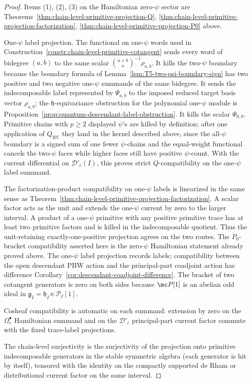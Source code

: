 \begin{proof}
  Items (1), (2), (3) on the Hamiltonian zero-$\psi$ sector are
  Theorems~\ref{thm:chain-level-primitive-projection-Q},
  \ref{thm:chain-level-primitive-projection-factorization},
  \ref{thm:chain-level-primitive-projection-P0} above.

  One-$\psi$ label projection.  The functional on one-\(\psi\) words used in
  Construction~\ref{constr:chain-level-primitive-cotangent} sends every
  word of bidegree \((a,b)\) to the same scalar
  \(\binom{a+b}{a}^{-1}\rho_{a,b}\).  It kills the two-\(\psi\) boundary
  because the boundary formula of
  Lemma~\ref{lem:T5-two-psi-boundary-sign} has two positive and two
  negative one-\(\psi\) summands of the same bidegree.  It sends
	  the indecomposable label represented by \(\Psi_{a,b}\) to the imposed
	  reduced target basis vector \(\rho_{a,b}\); the
	  \(\mathfrak h\)-equivariance obstruction for the polynomial
	  one-\(\psi\) module is
	  Proposition~\ref{prop:quantum-descendant-label-obstruction}.  It kills the scalar
  \(\Psi_{0,0}\).  Primitive chains with \(p\ge2\) displayed
  \(\psi\)'s are killed by definition; after one application of
  \(Q_{\mathrm{BV}}\) they land in the kernel described above, since the
  all-\(\psi\) boundary is a signed sum of one fewer \(\psi\)-chains and
  the equal-weight functional cancels the two-\(\psi\) faces while higher
  faces still have positive \(\psi\)-count.  With the current
  differential on \(\mathcal D'_c(I)\), this proves strict
  \(Q\)-compatibility on the one-\(\psi\) label summand.

  The factorization-product compatibility on one-\(\psi\) labels is
  linearized in the same sense as
  Theorem~\ref{thm:chain-level-primitive-projection-factorization}.  A
  scalar factor acts as the unit and extends the one-\(\psi\) current by
  zero to the larger interval.  A product of a one-\(\psi\) primitive with
  any positive primitive trace has at least two primitive factors and is
  killed in the indecomposable quotient.  Thus the unit-retaining
  exactly-one-positive projection agrees on the two routes.  The
		  $P_0$-bracket compatibility asserted here is the zero-$\psi$
		  Hamiltonian statement already proved above. The one-$\psi$ label projection
		  records labels; compatibility between the open descendant PBW
		  action and the principal-part coadjoint action has difference
		  Corollary~\ref{cor:descendant-coadjoint-difference}. The
	  bracket of two cotangent generators is zero on both sides because
	  $\mc P[1]$ is an abelian odd ideal in
  $\mathfrak g_I=\mathfrak h_I\ltimes\mathcal P_I[1]$.

	  Cosheaf compatibility is automatic on each summand: extension by zero
	  on the \(\Omega^\bullet_c\) Hamiltonian summand and on the
	  \(\mathcal D'_c\) principal-part current factor commute with the fixed
	  trace-label projections.

  The chain-level surjectivity is the surjectivity of the projection onto
  primitive indecomposable generators in the stable symmetric algebra
  (each generator is hit by itself), tensored with the identity on the
	  compactly supported de Rham or distributional current factor on the
	  same interval.
\end{proof}

